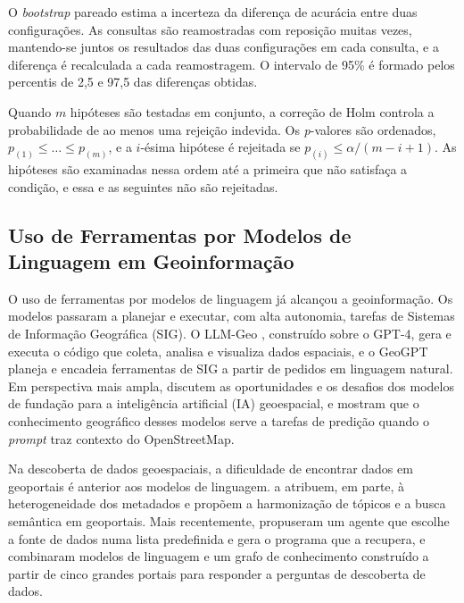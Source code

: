O \textit{bootstrap} pareado \cite{efron1993bootstrap} estima a incerteza da diferença de acurácia entre duas configurações. As consultas são reamostradas com reposição muitas vezes, mantendo-se juntos os resultados das duas configurações em cada consulta, e a diferença é recalculada a cada reamostragem. O intervalo de 95\% é formado pelos percentis de 2,5 e 97,5 das diferenças obtidas.

Quando $m$ hipóteses são testadas em conjunto, a correção de Holm \cite{holm1979simple} controla a probabilidade de ao menos uma rejeição indevida. Os \textit{p}-valores são ordenados, $p_{(1)} \le \dots \le p_{(m)}$, e a $i$-ésima hipótese é rejeitada se $p_{(i)} \le \alpha/(m - i + 1)$. As hipóteses são examinadas nessa ordem até a primeira que não satisfaça a condição, e essa e as seguintes não são rejeitadas.

\subsection{Uso de Ferramentas por Modelos de Linguagem em Geoinformação}
\label{sec:geoinformacao}

O uso de ferramentas por modelos de linguagem já alcançou a geoinformação. Os modelos passaram a planejar e executar, com alta autonomia, tarefas de Sistemas de Informação Geográfica (SIG). O LLM-Geo \cite{li2023autonomous}, construído sobre o GPT-4, gera e executa o código que coleta, analisa e visualiza dados espaciais, e o GeoGPT \cite{zhang2024geogpt} planeja e encadeia ferramentas de SIG a partir de pedidos em linguagem natural. Em perspectiva mais ampla,  discutem as oportunidades e os desafios dos modelos de fundação para a inteligência artificial (IA) geoespacial, e  mostram que o conhecimento geográfico desses modelos serve a tarefas de predição quando o \textit{prompt} traz contexto do OpenStreetMap.

Na descoberta de dados geoespaciais, a dificuldade de encontrar dados em geoportais é anterior aos modelos de linguagem.  a atribuem, em parte, à heterogeneidade dos metadados e propõem a harmonização de tópicos e a busca semântica em geoportais. Mais recentemente,  propuseram um agente que escolhe a fonte de dados numa lista predefinida e gera o programa que a recupera, e  combinaram modelos de linguagem e um grafo de conhecimento construído a partir de cinco grandes portais para responder a perguntas de descoberta de dados.

